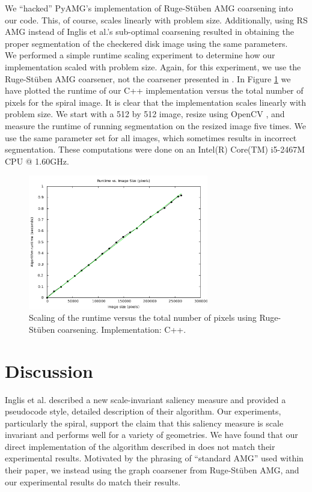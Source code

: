 \documentclass[12pt]{article}%
\begin{document}
We ``hacked'' PyAMG's implementation \cite{pyamg:2011} of Ruge-St\"uben AMG coarsening into our code.  This, of course, scales linearly with problem size.  Additionally, using RS AMG instead of Inglis et al.'s sub-optimal coarsening resulted in obtaining the proper segmentation of the checkered disk image using the same parameters.\\

We performed a simple runtime scaling experiment to determine how our implementation scaled with problem size.  Again, for this experiment, we use the Ruge-St\"uben AMG coarsener, not the coarsener presented in \cite{inglis:2010}.  In Figure \ref{fig:runtime_scaling} we have plotted the runtime of our C++ implementation versus the total number of pixels for the spiral image.  It is clear that the implementation scales linearly with problem size.  We start with a 512 by 512 image, resize using OpenCV \cite{opencv:2000}, and measure the runtime of running segmentation on the resized image five times.  We use the same parameter set for all images, which sometimes results in incorrect segmentation.  These computations were done on an Intel(R) Core(TM) i5-2467M CPU @ 1.60GHz.\\


\begin{figure}[ht]
   \centering
   \includegraphics[width=0.7\textwidth]{runtime_scaling_RSAMG_spiral_512_james.pdf}
   \caption{Scaling of the runtime versus the total number of pixels using Ruge-St\"uben coarsening.  Implementation: C++.}
   \label{fig:runtime_scaling}
\end{figure}

\newpage
\section{Discussion}
Inglis et al. described a new scale-invariant saliency measure and provided a pseudocode style, detailed description of their algorithm.  Our experiments, particularly the spiral, support the claim that this saliency measure is scale invariant and performs well for a variety of geometries.  We have found that our direct implementation of the algorithm described in \cite{inglis:2010} does not match their experimental results.  Motivated by the phrasing of ``standard AMG'' used within their paper, we instead using the graph coarsener from Ruge-St\"uben AMG, and our experimental results do match their results.  




\end{document}
